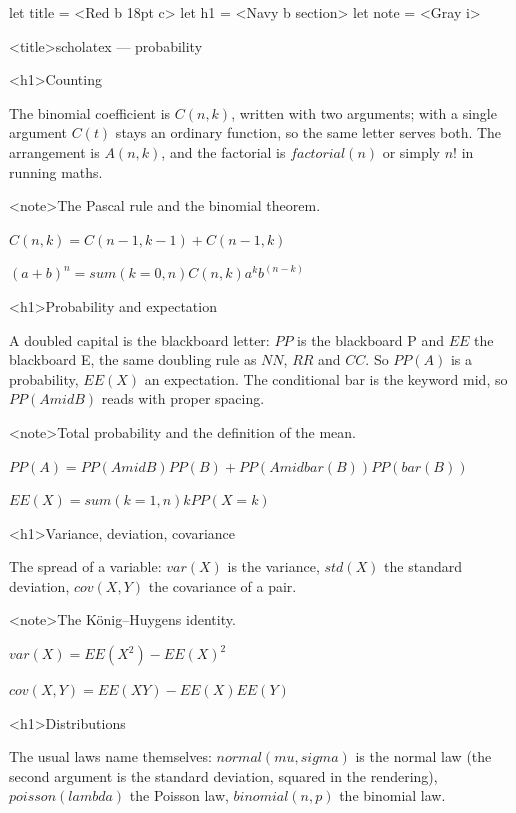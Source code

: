 \documentclass[
  margins=24,
  font=Latin Modern Roman,
  size=12,
  linespread=1.4,
  lang=en
]{scholatex}
\begin{document}
let title = <Red b 18pt c>
let h1    = <Navy b section>
let note  = <Gray i>

<title>scholatex — probability

<h1>Counting

The binomial coefficient is $C(n, k)$, written with two arguments; with a
single argument $C(t)$ stays an ordinary function, so the same letter serves
both. The arrangement is $A(n, k)$, and the factorial is $factorial(n)$ or
simply $n!$ in running maths.

<note>The Pascal rule and the binomial theorem.

$C(n, k) = C(n-1, k-1) + C(n-1, k)$

$(a + b)^n = sum(k=0,n) C(n, k) a^k b^(n-k)$

<h1>Probability and expectation

A doubled capital is the blackboard letter: $PP$ is the blackboard P and
$EE$ the blackboard E, the same doubling rule as $NN$, $RR$ and $CC$. So
$PP(A)$ is a probability, $EE(X)$ an expectation. The conditional bar is the
keyword mid, so $PP(A mid B)$ reads with proper spacing.

<note>Total probability and the definition of the mean.

$PP(A) = PP(A mid B) PP(B) + PP(A mid bar(B)) PP(bar(B))$

$EE(X) = sum(k=1,n) k PP(X = k)$

<h1>Variance, deviation, covariance

The spread of a variable: $var(X)$ is the variance, $std(X)$ the standard
deviation, $cov(X, Y)$ the covariance of a pair.

<note>The König–Huygens identity.

$var(X) = EE(X^2) - EE(X)^2$

$cov(X, Y) = EE(X Y) - EE(X) EE(Y)$

<h1>Distributions

The usual laws name themselves: $normal(mu, sigma)$ is the normal law (the
second argument is the standard deviation, squared in the rendering),
$poisson(lambda)$ the Poisson law, $binomial(n, p)$ the binomial law.
\end{document}
